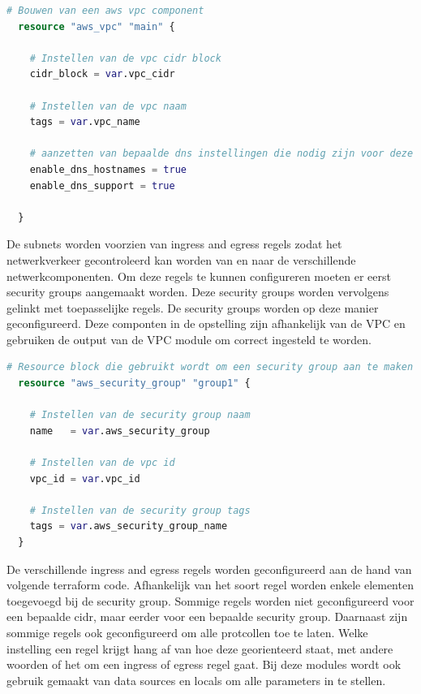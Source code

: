 \begin{lstlisting}[language=terraform]
  # Bouwen van een aws vpc component
  resource "aws_vpc" "main" {
  
    # Instellen van de vpc cidr block
    cidr_block = var.vpc_cidr
  
    # Instellen van de vpc naam
    tags = var.vpc_name
  
    # aanzetten van bepaalde dns instellingen die nodig zijn voor deze vpc
    enable_dns_hostnames = true
    enable_dns_support = true
  
  }
\end{lstlisting}

\vspace{0.5cm}
De subnets worden voorzien van ingress and egress regels zodat het netwerkverkeer gecontroleerd kan worden van en naar de verschillende netwerkcomponenten. Om deze regels te kunnen configureren moeten er eerst security groups aangemaakt worden. Deze security groups worden vervolgens gelinkt met toepasselijke regels. De security groups worden op deze manier geconfigureerd. Deze componten in de opstelling zijn afhankelijk van de VPC en gebruiken de output van de VPC module om correct ingesteld te worden.
\newline

\begin{lstlisting}[language=terraform]
  # Resource block die gebruikt wordt om een security group aan te maken
  resource "aws_security_group" "group1" { 
  
    # Instellen van de security group naam
    name   = var.aws_security_group
  
    # Instellen van de vpc id
    vpc_id = var.vpc_id 
  
    # Instellen van de security group tags
    tags = var.aws_security_group_name
  }
\end{lstlisting}

\vspace{0.5cm}
De verschillende ingress and egress regels worden geconfigureerd aan de hand van volgende terraform code. Afhankelijk van het soort regel worden enkele elementen toegevoegd bij de security group. Sommige regels worden niet geconfigureerd voor een bepaalde cidr, maar eerder voor een bepaalde security group. Daarnaast zijn sommige regels ook geconfigureerd om alle protcollen toe te laten. Welke instelling een regel krijgt hang af van hoe deze georienteerd staat, met andere woorden of het om een ingress of egress regel gaat. Bij deze modules wordt ook gebruik gemaakt van data sources en locals om alle parameters in te stellen.
\newline

